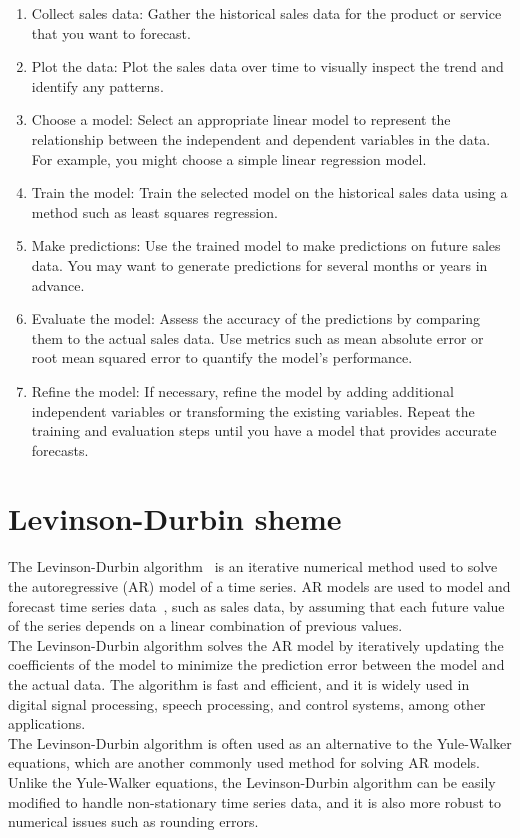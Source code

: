 \begin{enumerate}
    \item Collect sales data: Gather the historical sales data for the product or service that you want to forecast.
    \item Plot the data: Plot the sales data over time to visually inspect the trend and identify any patterns.
    \item Choose a model: Select an appropriate linear model to represent the relationship between the independent and dependent variables in the data. For example, you might choose a simple linear regression model.
    \item Train the model: Train the selected model on the historical sales data using a method such as least squares regression.
    \item Make predictions: Use the trained model to make predictions on future sales data. You may want to generate predictions for several months or years in advance.
    \item Evaluate the model: Assess the accuracy of the predictions by comparing them to the actual sales data. Use metrics such as mean absolute error or root mean squared error to quantify the model's performance.
    \item Refine the model: If necessary, refine the model by adding additional independent variables or transforming the existing variables. Repeat the training and evaluation steps until you have a model that provides accurate forecasts.
\end{enumerate}


\section{Levinson-Durbin sheme} \label{sec:levinson}

The Levinson-Durbin algorithm~\cite{Levinson} is an iterative numerical method used to solve the autoregressive (AR) model of a time series.
AR models are used to model and forecast time series data~\cite{Durbin}, such as sales data, by assuming that each future value of the series
depends on a linear combination of previous values.
\\
The Levinson-Durbin algorithm solves the AR model by iteratively updating the coefficients of the model to minimize the prediction
error between the model and the actual data. The algorithm is fast and efficient, and it is widely used in digital signal processing,
speech processing, and control systems, among other applications.
\\
The Levinson-Durbin algorithm is often used as an alternative to the Yule-Walker equations, which are another commonly used method for
solving AR models. Unlike the Yule-Walker equations, the Levinson-Durbin algorithm can be easily modified to handle non-stationary time
series data, and it is also more robust to numerical issues such as rounding errors.

